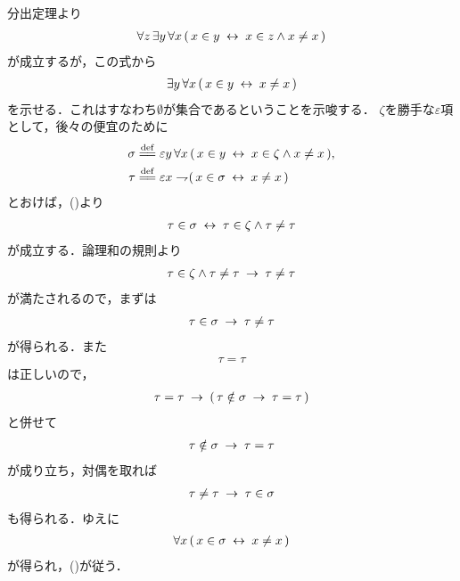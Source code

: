 	\begin{sketch}
		分出定理より
		\begin{align}
			\forall z\, \exists y\, \forall x\,
			(\, x \in y \hspace{0.25em}\leftrightarrow\hspace{0.25em} x \in z \wedge x \neq x\, )
			\label{fom:thm_emptyset_is_a_set_1}
		\end{align}
		が成立するが，この式から
		\begin{align}
			\exists y\, \forall x\, (\, x \in y \hspace{0.25em}\leftrightarrow\hspace{0.25em} x \neq x\, )
			\label{fom:thm_emptyset_is_a_set_2}
		\end{align}
		を示せる．これはすなわち$\emptyset$が集合であるということを示唆する．
		$\zeta$を勝手な$\varepsilon$項として，後々の便宜のために
		\begin{align}
			\sigma &\defeq \varepsilon y\, \forall x\,
			(\, x \in y \lrarrow x \in \zeta \wedge x \neq x\, ), \\
			\tau &\defeq \varepsilon x \negation
			(\, x \in \sigma \lrarrow x \neq x\, )
		\end{align}
		とおけば，()より
		\begin{align}
			\tau \in \sigma \hspace{0.25em}\leftrightarrow\hspace{0.25em} \tau \in \zeta \wedge \tau \neq \tau
		\end{align}
		が成立する．論理和の規則より
		\begin{align}
			\tau \in \zeta \wedge \tau \neq \tau \hspace{0.25em}\rightarrow\hspace{0.25em} \tau \neq \tau
		\end{align}
		が満たされるので，まずは
		\begin{align}
			\tau \in \sigma \hspace{0.25em}\rightarrow\hspace{0.25em} \tau \neq \tau
		\end{align}
		が得られる．また
		\begin{align}
			\tau = \tau
		\end{align}
		は正しいので，
		\begin{align}
			\tau = \tau \hspace{0.25em}\rightarrow\hspace{0.25em} (\, \tau \notin \sigma \hspace{0.25em}\rightarrow\hspace{0.25em}
			\tau = \tau\, )
		\end{align}
		と併せて
		\begin{align}
			\tau \notin \sigma \hspace{0.25em}\rightarrow\hspace{0.25em} \tau = \tau
		\end{align}
		が成り立ち，対偶を取れば
		\begin{align}
			\tau \neq \tau \hspace{0.25em}\rightarrow\hspace{0.25em} \tau \in \sigma
		\end{align}
		も得られる．ゆえに
		\begin{align}
			\forall x\, (\, x \in \sigma \hspace{0.25em}\leftrightarrow\hspace{0.25em} x \neq x\, )
		\end{align}
		が得られ，()が従う．
		\QED
	\end{sketch}
	
